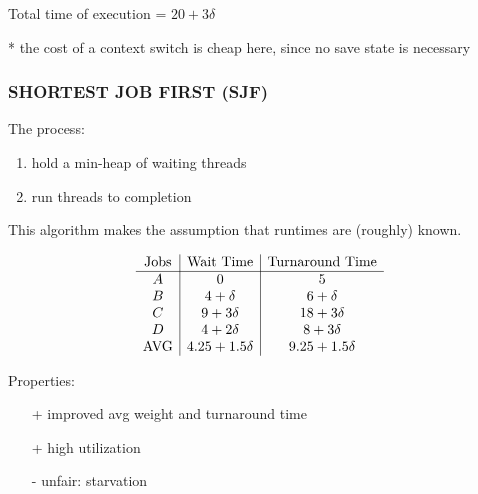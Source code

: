 \documentclass[../../lecture_notes.tex]{subfiles}
\begin{document}
Total time of execution = $20 + 3\delta$

*  the cost of a context switch is cheap here, since no save state is necessary


\subsubsection*{SHORTEST JOB FIRST (SJF)}
The process:
	\begin{enumerate}[nosep]
	\item hold a min-heap of waiting threads
	\item run threads to completion
	\end{enumerate}
This algorithm makes the assumption that runtimes are (roughly) known.

\begin{minipage}{0.5\linewidth}
\[ \begin{array}{ c | c | c }
	\text{Jobs} & \text{Wait Time} & \text{Turnaround Time} \\
	\hline
	A & 0 & 5 \\
	B & 4 + \delta& 6 + \delta \\
	C & 9 + 3\delta & 18 + 3\delta \\
	D & 4 + 2\delta & 8 + 3\delta \\
	\text{AVG} & 4.25 + 1.5\delta & 9.25 + 1.5\delta
\end{array} \]
\end{minipage}%
\begin{minipage}{0.5\linewidth}
\begin{center}
\end{center}

Properties:
\begin{enumerate}[nosep]
\item[+] improved avg weight and turnaround time
\item[+] high utilization
\item[-] unfair: starvation
\end{enumerate}
\end{minipage}
\end{document}
